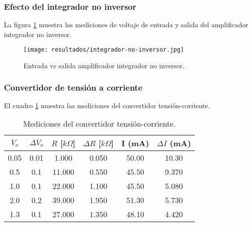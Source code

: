 \subsubsection{Efecto del integrador no inversor}

La figura \ref{fig:entrada-salida-integrador-no-inversor} muestra las mediciones de voltaje de entrada y salida del amplificador integrador no inversor.
\begin{figure}[ht]
    \centering
    \texttt{[image: resultados/integrador-no-inversor.jpg]}
    \caption{Entrada vs salida amplificador integrador no inversor.}
    \label{fig:entrada-salida-integrador-no-inversor}
\end{figure}

\subsubsection{Convertidor de tensión a corriente}

El cuadro \ref{tab:resultados-convertidor-tension-corriente} muestra las mediciones del convertidor tensión-corriente.

\begin{table}[h!]
\centering
\begin{tabular}{|c|c|c|c|c|c|}
\hline
\(V_o\) & \(\Delta V_o\) & \(R\) [$k\Omega$] & \(\Delta R\) [$k\Omega$] & I (mA) & \(\Delta I\) (mA) \\ \hline
0.05 & 0.01 & 1.000 & 0.050 & 50.00 & 10.30 \\ \hline
0.5 & 0.1 & 11.000 & 0.550 & 45.50 & 9.370 \\ \hline
1.0 & 0.1 & 22.000 & 1.100 & 45.50 & 5.080 \\ \hline
2.0 & 0.2 & 39.000 & 1.950 & 51.30 & 5.730 \\ \hline
1.3 & 0.1 & 27.000 & 1.350 & 48.10 & 4.420 \\ \hline
\end{tabular}
\caption{Mediciones del convertidor tensión-corriente.}
\label{tab:resultados-convertidor-tension-corriente}
\end{table}

